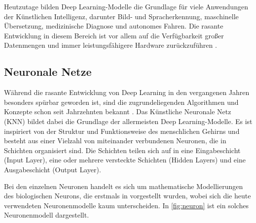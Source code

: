 Heutzutage bilden Deep Learning-Modelle die Grundlage für viele Anwendungen der Künstlichen Intelligenz, darunter Bild- und Spracherkennung, maschinelle Übersetzung, medizinische Diagnose und autonomes Fahren. Die rasante Entwicklung in diesem Bereich ist vor allem auf die Verfügbarkeit großer Datenmengen und immer leistungsfähigere Hardware zurückzuführen \parencite{Goodfellow2016deeplearning}.

\subsection{Neuronale Netze} \label{subsec:neural-networks}

Während die rasante Entwicklung von Deep Learning in den vergangenen Jahren besonders spürbar geworden ist, sind die zugrundeliegenden Algorithmen und Konzepte schon seit Jahrzehnten bekannt \parencite{Goodfellow2016deeplearning}. Das Künstliche Neuronale Netz (KNN) bildet dabei die Grundlage der allermeisten Deep Learning-Modelle. Es ist inspiriert von der Struktur und Funktionsweise des menschlichen Gehirns und besteht aus einer Vielzahl von miteinander verbundenen Neuronen, die in Schichten organisiert sind. Die Schichten teilen sich auf in eine Eingabeschicht (Input Layer), eine oder mehrere versteckte Schichten (Hidden Layers) und eine Ausgabeschicht (Output Layer).


Bei den einzelnen Neuronen handelt es sich um mathematische Modellierungen des biologischen Neurons, die erstmals in \parencite{McCulloch1943nn} vorgestellt wurden, wobei sich die heute verwendeten Neuronenmodelle kaum unterscheiden. In \autoref{fig:neuron} ist ein solches Neuronenmodell dargestellt.

